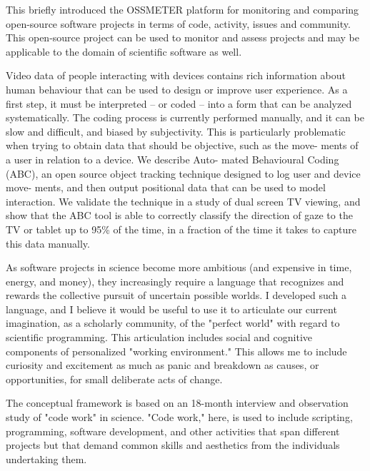 \documentclass[a4paper,UKenglish]{dagrep}
\begin{document}

This briefly introduced the OSSMETER platform for monitoring and comparing open-source software projects in terms of code, activity, issues and community. This open-source project can be used to monitor and assess projects and may be applicable to the domain of scientific software as well.

\abstractauthor[]{}
 
Video data of people interacting with devices contains rich information about human behaviour that can be used to design or improve user experience. As a first step, it must be interpreted – or coded – into a form that can be analyzed systematically. The coding process is currently performed manually, and it can be slow and difficult, and biased by subjectivity. This is particularly problematic when trying to obtain data that should be objective, such as the move- ments of a user in relation to a device. We describe Auto- mated Behavioural Coding (ABC), an open source object tracking technique designed to log user and device move- ments, and then output positional data that can be used to model interaction. We validate the technique in a study of dual screen TV viewing, and show that the ABC tool is able to correctly classify the direction of gaze to the TV or tablet up to 95\% of the time, in a fraction of the time it takes to capture this data manually.
 

As software projects in science become more ambitious (and expensive in time, energy, and money), they increasingly require a language that recognizes and rewards the collective pursuit of uncertain possible worlds. I developed such a language, and I believe it would be useful to use it to articulate our current imagination, as a scholarly community, of the "perfect world" with regard to scientific programming. This articulation includes social and cognitive components of personalized "working environment." This allows me to include curiosity and excitement as much as panic and breakdown as causes, or opportunities, for small deliberate acts of change.

The conceptual framework is based on an 18-month interview and observation study of "code work" in science. "Code work," here, is used to include scripting, programming, software development, and other activities that span different projects but that demand common skills and aesthetics from the individuals undertaking them.
\end{document}
